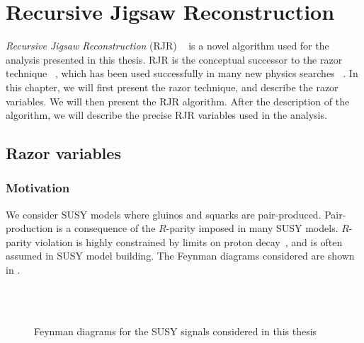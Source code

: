 

\chapter[Recursive Jigsaw Reconstruction][Recursive Jigsaw Reconstruction]{Recursive Jigsaw Reconstruction}
\label{ch:jigsaw}

\textit{Recursive Jigsaw Reconstruction} (RJR) ~\cite{Jackson:2016mfb,ATLAS-CONF-2016-078} is a novel algorithm used for the analysis presented in this thesis.
RJR is the conceptual successor to the razor technique ~\cite{Rogan:2010kb,Buckley:2013kua}, which has been used successfully in many new physics searches ~\cite{SUSY-2014-05,SUSY-2014-06,CMS-SUS-13-004,CMS-SUS-12-005,CMS-SUS-11-024,SUSY-2011-22}.
In this chapter, we will first present the razor technique, and describe the razor variables.
We will then present the RJR algorithm.
After the description of the algorithm, we will describe the precise RJR variables used in the analysis.

\section{Razor variables}

\subsection{Motivation}
We consider SUSY models where gluinos and squarks are pair-produced.
Pair-production is a consequence of the $R$-parity imposed in many SUSY models.
$R$-parity violation is highly constrained by limits on proton decay~\cite{susyPrimer}, and is often assumed in SUSY model building.
The Feynman diagrams considered are shown in .
\begin{figure}[tbp]
\caption{Feynman diagrams for the SUSY signals considered in this thesis} \label{fig:feynman_signal}
 \\
 \\
\end{figure}

